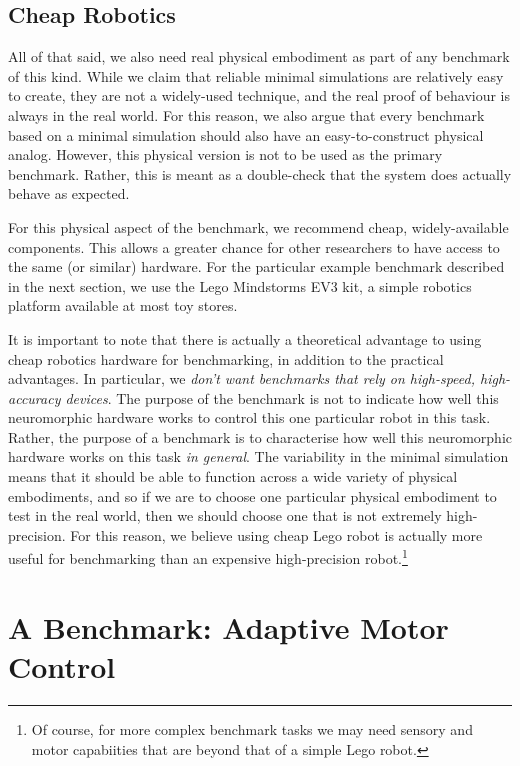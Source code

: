 \documentclass{frontiersSCNS} %
\begin{document}
\subsection{Cheap Robotics}

All of that said, we also need real physical embodiment as part of any
benchmark of this kind.  While we claim that reliable minimal simulations
are relatively easy to create, they are not a widely-used technique, and the
real proof of behaviour is always in the real world.  For this reason, we
also argue that every benchmark based on a minimal simulation should also
have an easy-to-construct physical analog.  However, this physical version
is not to be used as the primary benchmark.  Rather, this is meant as a
double-check that the system does actually behave as expected.  

For this physical aspect of the benchmark, we recommend cheap, widely-available
components.  This allows a greater chance for other researchers to have
access to the same (or similar) hardware.  For the particular example 
benchmark described in the next section, we use the Lego Mindstorms EV3 kit,
a simple robotics platform available at most toy stores.

It is important to note that there is actually a theoretical advantage to
using cheap robotics hardware for benchmarking, in addition to the practical
advantages.  In particular, we \emph{don't want benchmarks that rely on
high-speed, high-accuracy devices}.  The purpose of the benchmark
is not to indicate how well this neuromorphic hardware works to control this
one particular robot in this task.  Rather, the purpose of a benchmark is to
characterise how well this neuromorphic hardware works on this task 
\emph{in general}.  The variability in the minimal simulation means that it
should be able to function across a wide variety of physical embodiments, and
so if we are to choose one particular physical embodiment to test in the
real world, then we should choose one that is not extremely high-precision.
For this reason, we believe using cheap Lego robot is actually more useful
for benchmarking than an expensive high-precision robot.\footnote{Of course,
for more complex benchmark tasks we may need sensory and motor capabiities
that are beyond that of a simple Lego robot.}

\section{A Benchmark: Adaptive Motor Control}
\end{document}
